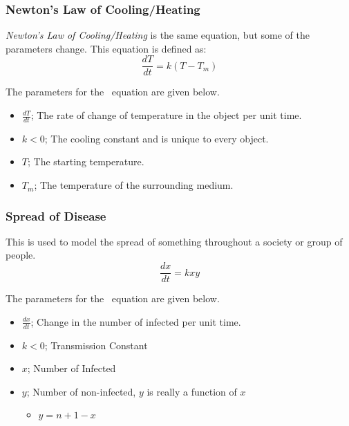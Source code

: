 \subsubsection{Newton's Law of Cooling/Heating} \label{subsubsec:Newton Law of Cooling/Heating}
\begin{definition} \label{def:Newton Law of Cooling/Heating}
  \emph{Newton's Law of Cooling/Heating} is the same equation, but some of the parameters change.
  This equation is defined as:
  \begin{equation} \label{eq:Newton Law of Cooling/Heating}
    \frac{dT}{dt} = k \left( T-T_{m} \right)
  \end{equation}
  \begin{remark} \label{rmk:Newton Law of Cooling/Heating Parameters}
    The parameters for the ~equation are given below.
    \begin{itemize}[noitemsep, nolistsep]
    \item $\frac{dT}{dt}$; The rate of change of temperature in the object per unit time.
    \item $k<0$; The cooling constant and is unique to every object.
    \item $T$; The starting temperature.
    \item $T_{m}$; The temperature of the surrounding medium.
    \end{itemize}
  \end{remark}
\end{definition}
\subsubsection{Spread of Disease} \label{subsubsec:Spread of Disease}
\begin{definition} \label{def:Spread of Disease}
  This is used to model the spread of something throughout a society or group of people.
  \begin{equation} \label{eq:Spread of Disease}
    \frac{dx}{dt} = kxy
  \end{equation}
  \begin{remark}
    The parameters for the ~equation are given below.
    \begin{itemize}[noitemsep, nolistsep]
    \item $\frac{dx}{dt}$; Change in the number of infected per unit time.
    \item $k<0$; Transmission Constant
    \item$x$; Number of Infected
    \item $y$; Number of non-infected, $y$ is really a function of $x$
      \begin{itemize}[noitemsep, nolistsep]
      \item $y = n+1-x$
      \end{itemize}
    \end{itemize}
  \end{remark}
\end{definition}

